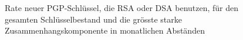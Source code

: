 \begin{figure}[th!]
  \centering
  \caption{Rate neuer PGP-Schl\"ussel, die RSA oder DSA benutzen,
    f\"ur den gesamten Schl\"usselbestand  und
    die gr\"osste starke Zusammenhangskomponente
     in monatlichen Abst\"anden}
  \label{fig:pkalg}
\end{figure}

